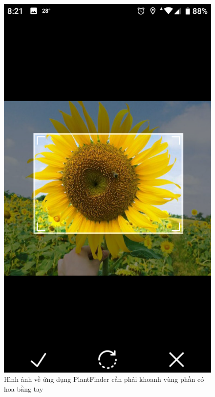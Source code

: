 \documentclass[12pt]{report}
\begin{document}
		\begin{figure}[h]
			\centering
			\includegraphics[scale=0.13]{app_1}
			\caption{Hình ảnh về ứng dụng PlantFinder cần phải khoanh vùng phần có hoa bằng tay}
			\label{fig:app_1}
		\end{figure}
														
\end{document}
